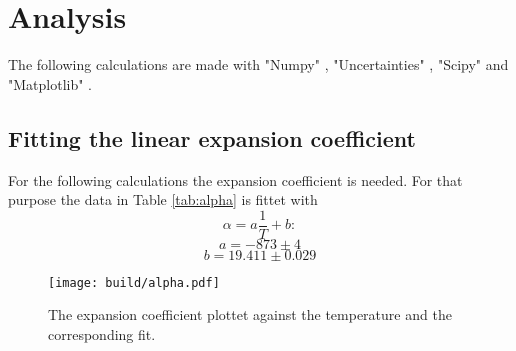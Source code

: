 \section{Analysis}
\label{sec:Auswertung}
The following calculations are made with  "Numpy" \cite{numpy}, 
"Uncertainties" \cite{uncertainties}, 
"Scipy" \cite{scipy} and  "Matplotlib" \cite{matplotlib}.

\subsection{Fitting the linear expansion coefficient}
For the following calculations the expansion coefficient is needed.
For that purpose the data in Table \ref{tab:alpha}
is fittet with
\begin{equation}
    \alpha = a \frac{1}{T} + b:
    \label{eq:alpha}
\end{equation}
\begin{equation*}
    a = -873 \pm 4
\end{equation*}
\begin{equation*}
    b= 19.411 \pm 0.029
\end{equation*}

\begin{figure}
    \centering 
    \texttt{[image: build/alpha.pdf]}
    \caption{The expansion coefficient plottet against the temperature and the corresponding fit.}
\end{figure}

